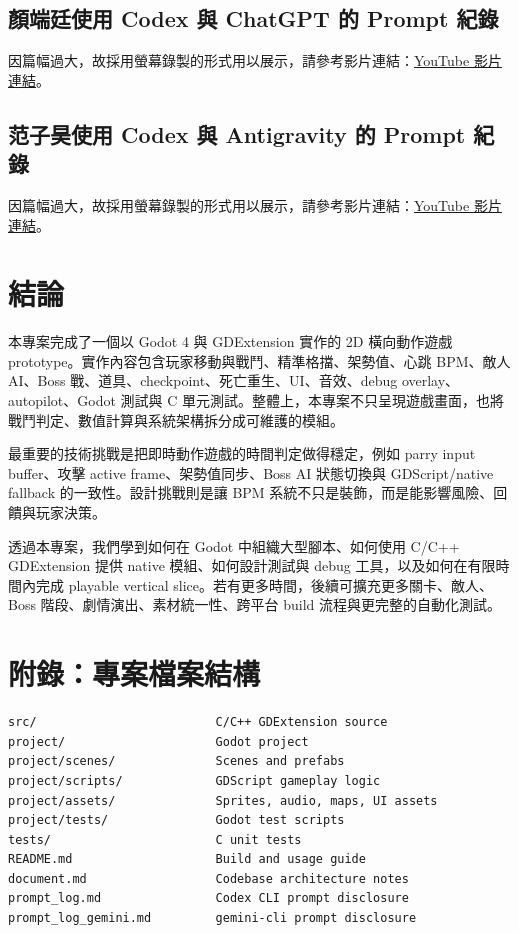 \documentclass[12pt,a4paper]{article}
\begin{document}
\subsection{顏端廷使用 Codex 與 ChatGPT 的 Prompt 紀錄}
因篇幅過大，故採用螢幕錄製的形式用以展示，請參考影片連結：\href{https://youtu.be/Xp396Fx395E}{YouTube 影片連結}。

\subsection{范子昊使用 Codex 與 Antigravity 的 Prompt 紀錄}
因篇幅過大，故採用螢幕錄製的形式用以展示，請參考影片連結：\href{https://youtu.be/NPqH6vN8TdQ?si=lx7U6TC8le3jgPIL}{YouTube 影片連結}。

\section{結論}

本專案完成了一個以 Godot 4 與 GDExtension 實作的 2D 橫向動作遊戲 prototype。實作內容包含玩家移動與戰鬥、精準格擋、架勢值、心跳 BPM、敵人 AI、Boss 戰、道具、checkpoint、死亡重生、UI、音效、debug overlay、autopilot、Godot 測試與 C 單元測試。整體上，本專案不只呈現遊戲畫面，也將戰鬥判定、數值計算與系統架構拆分成可維護的模組。

最重要的技術挑戰是把即時動作遊戲的時間判定做得穩定，例如 parry input buffer、攻擊 active frame、架勢值同步、Boss AI 狀態切換與 GDScript/native fallback 的一致性。設計挑戰則是讓 BPM 系統不只是裝飾，而是能影響風險、回饋與玩家決策。

透過本專案，我們學到如何在 Godot 中組織大型腳本、如何使用 C/C++ GDExtension 提供 native 模組、如何設計測試與 debug 工具，以及如何在有限時間內完成 playable vertical slice。若有更多時間，後續可擴充更多關卡、敵人、Boss 階段、劇情演出、素材統一性、跨平台 build 流程與更完整的自動化測試。

\appendix
\section{附錄：專案檔案結構}

\begin{lstlisting}[caption={專案檔案結構}]
src/                         C/C++ GDExtension source
project/                     Godot project
project/scenes/              Scenes and prefabs
project/scripts/             GDScript gameplay logic
project/assets/              Sprites, audio, maps, UI assets
project/tests/               Godot test scripts
tests/                       C unit tests
README.md                    Build and usage guide
document.md                  Codebase architecture notes
prompt_log.md                Codex CLI prompt disclosure
prompt_log_gemini.md         gemini-cli prompt disclosure
\end{lstlisting}
\end{document}
